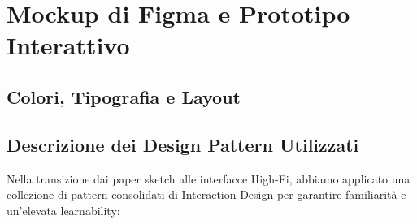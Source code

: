 \section{Mockup di Figma e Prototipo Interattivo}

\subsection{Colori, Tipografia e Layout}

\subsection{Descrizione dei Design Pattern Utilizzati}

Nella transizione dai paper sketch alle interfacce High-Fi, abbiamo applicato una collezione di pattern consolidati di Interaction Design per garantire familiarità e un'elevata learnability:

